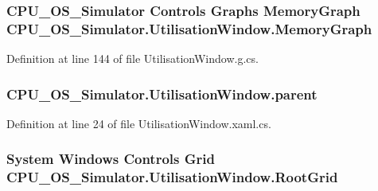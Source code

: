 \subsubsection[{Memory\+Graph}]{\setlength{\rightskip}{0pt plus 5cm}C\+P\+U\+\_\+\+O\+S\+\_\+\+Simulator Controls Graphs {\bf Memory\+Graph} C\+P\+U\+\_\+\+O\+S\+\_\+\+Simulator.\+Utilisation\+Window.\+Memory\+Graph\hspace{0.3cm}{\ttfamily [package]}}\label{class_c_p_u___o_s___simulator_1_1_utilisation_window_aa26e672bc20df2926cc39de95dca5577}


Definition at line 144 of file Utilisation\+Window.\+g.\+cs.

\hypertarget{class_c_p_u___o_s___simulator_1_1_utilisation_window_ab13e4df3318398d0e3c3565de5db4806}{}
\subsubsection[{parent}]{ C\+P\+U\+\_\+\+O\+S\+\_\+\+Simulator.\+Utilisation\+Window.\+parent\hspace{0.3cm}{\ttfamily [private]}}\label{class_c_p_u___o_s___simulator_1_1_utilisation_window_ab13e4df3318398d0e3c3565de5db4806}


Definition at line 24 of file Utilisation\+Window.\+xaml.\+cs.

\hypertarget{class_c_p_u___o_s___simulator_1_1_utilisation_window_a5017c2a587717b1d39bbefb3128f0005}{}
\subsubsection[{Root\+Grid}]{\setlength{\rightskip}{0pt plus 5cm}System Windows Controls Grid C\+P\+U\+\_\+\+O\+S\+\_\+\+Simulator.\+Utilisation\+Window.\+Root\+Grid\hspace{0.3cm}{\ttfamily [package]}}\label{class_c_p_u___o_s___simulator_1_1_utilisation_window_a5017c2a587717b1d39bbefb3128f0005}


